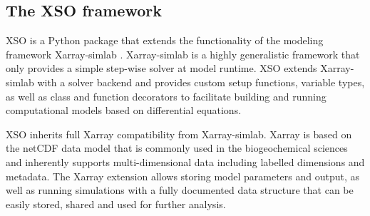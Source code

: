 \documentclass[journal abbreviation, manuscript]{copernicus}
\begin{document}
\subsection{The XSO framework} \label{Section:XSOFramework}

XSO is a Python package that extends the functionality of the modeling framework Xarray-simlab \citep{Bovy2018Xarray-simlab:Interactively}. Xarray-simlab is a highly generalistic framework that only provides a simple step-wise solver at model runtime. XSO extends Xarray-simlab with a solver backend and provides custom setup functions, variable types, as well as class and function decorators to facilitate building and running computational models based on differential equations. 

XSO inherits full Xarray compatibility from Xarray-simlab. Xarray is based on the netCDF data model that is commonly used in the biogeochemical sciences and inherently supports multi-dimensional data including labelled dimensions and metadata. The Xarray extension allows storing model parameters and output, as well as running simulations with a fully documented data structure that can be easily stored, shared and used for further analysis.
\end{document}
